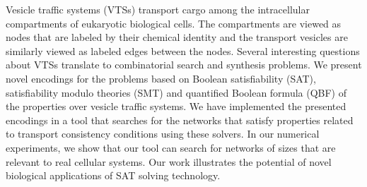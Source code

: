 Vesicle traffic systems (VTSs) transport cargo among the intracellular compartments of eukaryotic biological cells.
%
The compartments are viewed as nodes that are labeled by their chemical identity and the transport vesicles are similarly viewed as labeled edges between the nodes.
%
Several interesting questions about VTSs translate to combinatorial search and synthesis problems. 
%
We present novel encodings for the problems
based on Boolean satisfiability (SAT), satisfiability modulo theories (SMT) and
quantified Boolean formula (QBF) of the properties over vesicle traffic systems.
%
We have implemented the presented encodings in a tool that searches for the networks that satisfy properties related to transport consistency conditions using these solvers. 
%
In our numerical experiments, we show that our tool can search for networks of sizes that are relevant to real cellular systems.
%
Our work illustrates the potential of novel biological applications of
SAT solving technology.

%
%
%

